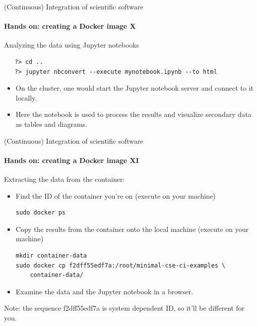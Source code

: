 \begin{frame}[fragile]{(Continuous) Integration of scientific software} 
    \framesubtitle{Hands on: creating a Docker image X} 
    \vfill

    Analyzing the data using Jupyter notebooks

\begin{verbatim}
   ?> cd ..
   ?> jupyter nbconvert --execute mynotebook.ipynb --to html 
\end{verbatim}

    \begin{itemize}
        \item On the cluster, one would start the Jupyter notebook server and connect to it locally. 
        \item Here the notebook is used to process the results and visualize secondary data as tables and diagrams.
    \end{itemize}

\end{frame}

\begin{frame}[fragile]{(Continuous) Integration of scientific software} 
    \framesubtitle{Hands on: creating a Docker image XI} 
    \vfill

    Extracting the data from the container:
    \begin{itemize}
        \item Find the ID of the container you're on (execute on your machine)
            
            \begin{verbatim}
sudo docker ps 
            \end{verbatim}

        \item Copy the results from the container onto the local machine (execute on your machine)
            \begin{verbatim}
mkdir container-data
sudo docker cp f2dff55edf7a:/root/minimal-cse-ci-examples \
    container-data/
            \end{verbatim}
        \item Examine the data and the Jupyter notebook in a browser.
    \end{itemize}

    Note: the sequence f2dff55edf7a is system dependent ID, so it'll be different for you.

\end{frame}

